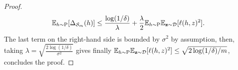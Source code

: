 \begin{noaddcontents}
\begin{proof}
        \[\mathbb{E}_{h\sim \mathrm{P}}[\Delta_{\mathcal{S}_m}(h)] \leq \frac{\log(1/\delta)}{\lambda} + \frac{\lambda}{2}\mathbb{E}_{h\sim\mathrm{P}}\mathbb{E}_{\mathbf{z}\sim\mathcal{D}}[\ell(h,z)^2]. \]
        The last term on the right-hand side is bounded by $\sigma^2$ by assumption, then, taking $\lambda= \sqrt{\frac{2\log(1/\delta)}{\sigma^2}}$ gives finally $\mathbb{E}_{h\sim\mathrm{P}}\mathbb{E}_{\mathbf{z}\sim\mathcal{D}}[\ell(h,z)^2] \leq \sqrt{2\log(1/\delta)/m}$, concludes the proof.
    \end{proof}
    
    \begin{comment}
        
    
    \subsection{Proof of Proposition \ref{prop: sgd_bound}}
    \label{sec: proof_sgd_bound}
    \begin{proof}
      We take $\mathbf{h}^* \in \mathrm{argmin}_{h\in\Hcal} \Risk_\D(h)$. We then apply Theorem \ref{th:2-wass} with $\Q,\P$ being the Dirac distributions in $\mathbf{h}_t,\mathbf{h}^*$ and $f= \Risk_\D- \hat{\Risk}_{\S_m}$ which have $2G$-Lipschitz gradients. Re-organising gives
     \begin{align*}
        \Risk_\D(\mathbf{h}_t) - \Risk_\D(\mathbf{h}^*) & \leq \hat{\Risk}_{\S_m}(\mathbf{h}_{T+1}) + G ||\mathbf{h}_{T+1}- \mathbf{h}^*\|^2 -  \hat{\Risk}_{\S_m}(\mathbf{h}^*)  + 2R\|\nabla\Risk_\D(\mathbf{h}_{T+1})- \nabla \hat{\Risk}_{\S_m}(\mathbf{h}_{T+1})\|.
      \end{align*}  
    
      Finally, using that $\hat{\Risk}_{\S_m}(\mathbf{h}_{T+1})-  \hat{\Risk}_{\S_m}(\mathbf{h}^*) \leq 0$ and taking the infimum on $\mathbf{h^*}$ gives,
      
      \begin{align*}
        \Risk_\D(\mathbf{h}_t) - \Risk_\D(\mathbf{h}^*) & \leq  \inf_{\mathbf{h}^* \in \mathrm{argmin}\; \Risk_\D}\;G||\mathbf{h}_{T+1}- \mathbf{h}^*\|^2   + 2R\|\nabla\Risk_\D(\mathbf{h}_{T+1})- \nabla \hat{\Risk}_{\S_m}(\mathbf{h}_{T+1})\|.
      \end{align*} 
      Finally, using that 
      $$\|\nabla\Risk_\D(\mathbf{h}_t)- \nabla \hat{\Risk}_{\S_m}(\mathbf{h}_t)\| = \sqrt{\|\nabla\Risk_\D(\mathbf{h}_t)- \nabla \hat{\Risk}_{\S_m}(\mathbf{h}_t)\|^2},$$
      and applying Lemma \ref{l: sgd_gradient_bounds} concludes the proof.
    
    \end{proof}
    
    \end{comment}
\end{noaddcontents}
